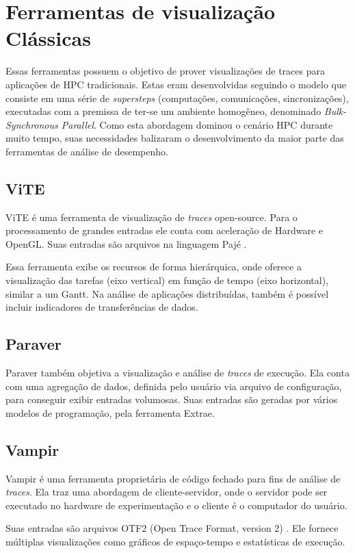 \documentclass[ppgc,espec]{iiufrgs}
\begin{document}
\section{Ferramentas de visualização Clássicas}

Essas ferramentas possuem o objetivo de prover visualizações de traces para aplicações de HPC tradicionais. Estas eram desenvolvidas
seguindo o modelo que consiste em uma série de \emph{supersteps} (computações, comunicações, sincronizações), executadas com a premissa de ter-se um ambiente homogêneo, denominado \emph{Bulk-Synchronous Parallel}. Como esta abordagem  dominou o cenário HPC durante muito tempo, suas necessidades
balizaram o desenvolvimento da maior parte das ferramentas de análise de desempenho.

\subsection{ViTE}
ViTE \cite{ref:vite} é uma ferramenta de visualização de \emph{traces} open-source. Para o processamento de grandes entradas ele conta com aceleração de Hardware e OpenGL. Suas entradas são arquivos na linguagem Pajé \cite{ref:paje}.

Essa ferramenta exibe os recursos de forma hierárquica, onde oferece a visualização das tarefas (eixo vertical) em função de tempo (eixo horizontal), similar a um Gantt. Na análise de aplicações distribuídas, também é possível incluir indicadores de transferências de dados.

\subsection{Paraver}
Paraver \cite{ref:paraver} também objetiva a visualização e análise de \emph{traces} de execução. Ela conta com uma agregação de dados, definida pelo
usuário via arquivo de configuração, para conseguir exibir entradas volumosas. Suas entradas são geradas por vários modelos de programação, pela ferramenta Extrae.

\subsection{Vampir}
Vampir \cite{ref:vampir} é uma ferramenta proprietária de código fechado para fins de análise de \emph{traces}. Ela traz uma abordagem de cliente-servidor, onde o servidor pode ser executado no hardware de experimentação e o cliente é o computador do usuário.

Suas entradas são arquivos OTF2 (Open Trace Format, version 2) \cite{ref:otf2}. Ele fornece múltiplas visualizações como gráficos de espaço-tempo e estatísticas de execução.
\end{document}
